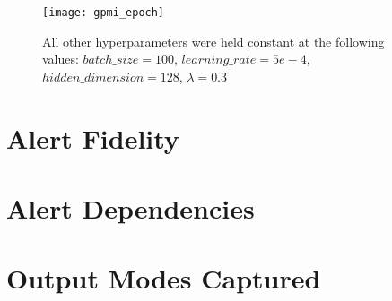\begin{figure}[!htbp]
	\centering%
	\texttt{[image: gpmi\_epoch]}
	\caption{
		All other hyperparameters were held constant at the following values: $batch\_size=100$, $learning\_rate=5e-4$, $hidden\_dimension=128$, $\lambda=0.3$
	}
	\label{fig:gpmi_epoch}
\end{figure}



\section{Alert Fidelity}
\label{sec:fidel}



\section{Alert Dependencies}
\label{sec:deped}



\section{Output Modes Captured}
\label{sec:output}


